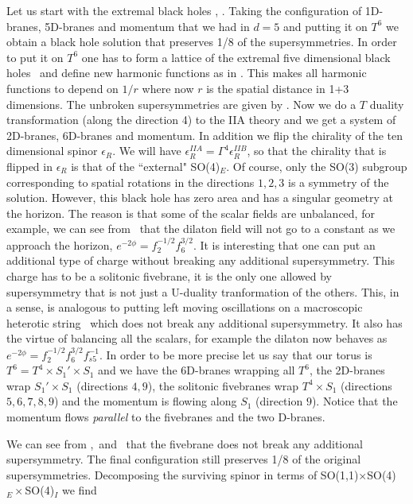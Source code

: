 Let us start with the extremal black holes %
\ms , \cliffordfd . 
Taking the configuration of 1D-branes, 5D-branes
and momentum that we had in $d=5$ 
and putting it on $T^6$ we obtain a 
black hole solution that preserves 1/8 of the supersymmetries.
In order  to put it on $T^6$ one has to form a lattice of
the extremal five dimensional black holes \tenfived\ and 
define new harmonic functions as in \lattice . 
This makes all harmonic functions to depend on 
$1/r$ where now $r$ is the spatial distance in 
1+3 dimensions. 
The unbroken supersymmetries are given by 
\spinor . Now we do a $T$ duality transformation
(along the direction 4)  to 
the IIA theory and we get a system of 2D-branes, 6D-branes
and momentum. In addition we flip the chirality of 
the ten dimensional spinor $\epsilon_R$.
We will have $\epsilon_R^{IIA}  = \Gamma^4 \epsilon_R^{IIB} $, 
so that
the chirality that is flipped in $\epsilon_R$ is that
of the ``external" SO(4)$_E$. Of course, only the SO(3) subgroup
corresponding to spatial rotations in the 
 directions $1,2,3$ is a symmetry 
of the solution.
However, this black hole has zero area and
has a singular geometry at the horizon. The reason 
is that some of the scalar fields are unbalanced, 
for example, we can see from \pbrane\ that the dilaton
field will  not go to a constant as we approach the horizon,
$e^{-2 \phi } = f_2^{-1/2} f_6^{3/2}$.
It is interesting that one can put an additional 
type of charge without breaking any additional supersymmetry.
This charge has to be a solitonic fivebrane, it is the 
only one allowed by supersymmetry that is not just 
a U-duality tranformation of the others.
This, in a sense, is analogous to putting left moving
oscillations on a macroscopic heterotic string
\cmp\ which does not break any additional supersymmetry. 
It also has the virtue of balancing all the scalars,
for example the dilaton now behaves as $e^{- 2 \phi } =
f_2^{-1/2} f_6^{3/2} f^{-1}_{s5} $.
In order to 
be more precise let us say that our torus is
$T^6 = T^4\times S_1' \times S_1$
and we have the 6D-branes wrapping all $T^6$, the 
2D-branes wrap $ S_1' \times S_1$ (directions $4,9$),
 the solitonic
fivebranes wrap $T^4\times S_1$ (directions $5,6,7,8,9$)
and the momentum
is flowing along $S_1$ (direction $9$).
 Notice that the momentum
flows {\it parallel } to the fivebranes and the two D-branes. 

We can see from \susydbrane ,\susymom\ and   \susyfive\ 
that the fivebrane does not break any additional supersymmetry.
The
final configuration still preserves 1/8 of the original
supersymmetries. Decomposing the surviving spinor in 
terms of SO(1,1)$\times$SO(4)$_E\times$SO(4)$_I$ we find
\eqn{}

